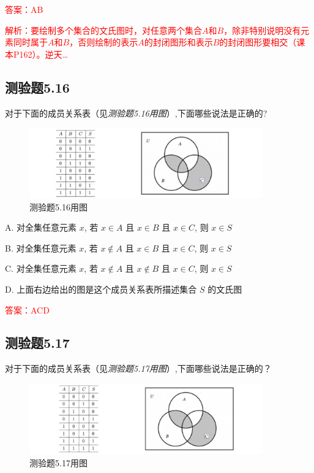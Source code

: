 \documentclass[UTF8, heading=true]{ctexart}
\begin{document}
\textcolor{red}{答案：AB}

\textcolor{red}{解析：要绘制多个集合的文氏图时，对任意两个集合$A$和$B$，除非特别说明没有元素同时属于$A$和$B$，否则绘制的表示$A$的封闭图形和表示$B$的封闭图形要相交（课本P162）。逆天\dots}




\subsection{测验题5.16}

对于下面的成员关系表（见\textit{测验题5.16用图}）,下面哪些说法是正确的?

\begin{figure}[H]
  \centering
  \includegraphics[width=0.9\textwidth]{5.16.jpg} %
  \caption{测验题5.16用图}
\end{figure}


A. 对全集任意元素 $x$, 若 $x \in A$ 且 $x \in B$ 且 $x \in C$, 则 $x \in S$

B. 对全集任意元素 $x$, 若 $x \notin A$ 且 $x \in B$ 且 $x \in C$, 则 $x \in S$

C. 对全集任意元素 $x$, 若 $x \notin A$ 且 $x \notin B$ 且 $x \in C$, 则 $x \in S$

D. 上面右边给出的图是这个成员关系表所描述集合 $S$ 的文氏图

\textcolor{red}{答案：ACD}

\subsection{测验题5.17}
对于下面的成员关系表（见\textit{测验题5.17用图}）,下面哪些说法是正确的？

\begin{figure}[H]
  \centering
  \includegraphics[width=0.9\textwidth]{5.17.jpg} %
  \caption{测验题5.17用图}
\end{figure}
\end{document}
